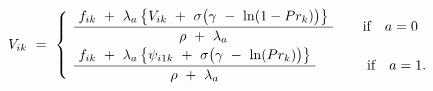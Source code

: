 \begin{equation}
    V_{ik} \ = \
    \begin{cases}
        \begin{split}
            & 
            \ \frac{
                \ f_{ik} \ + \ \lambda_{a} \left\{ V_{ik} \ + \ \sigma \big( \gamma \ - \ \ln(1 - Pr_{k}) \big) \right\} \
            }{
                \rho \ + \ \lambda_{a}
            } \hspace{0.7cm} \text{if \ \ $a = 0$} \\
            &
            \ \frac{
                \ f_{ik} \ + \ \lambda_{a} \left\{ \psi_{i1k} \ + \ \sigma \big( \gamma \ - \ \ln(Pr_{k}) \big) \right\} \
            }{
                \rho \ + \ \lambda_{a}
            } \hspace{1.25cm} \text{if \ \ $a = 1$}.
        \end{split}
    \end{cases}
\label{Equation:Firms-Problem_Euler-Equation}
\end{equation}